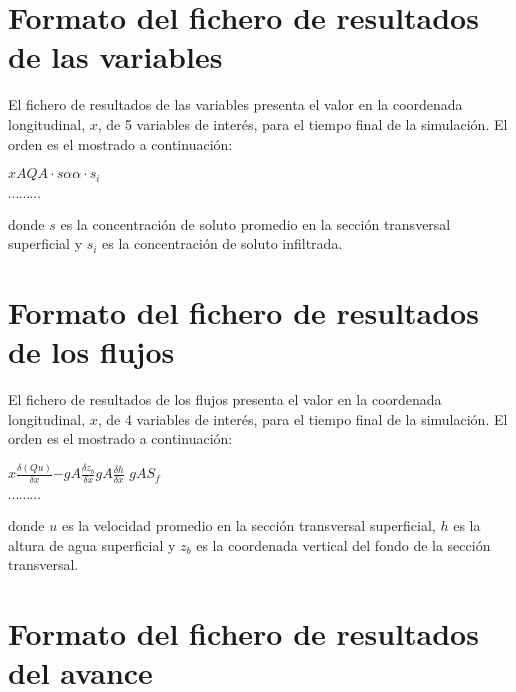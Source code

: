 \documentclass[a4paper,12pt]{report}
\begin{document}
\section{Formato del fichero de resultados de las variables}
El fichero de resultados de las variables presenta el valor en la coordenada longitudinal, $x$, de 5 variables de interés, para el tiempo final de la simulación. El orden es el mostrado a continuación:

\hspace{1.8cm}$x$\hspace{0.9cm}$A$\hspace{0.9cm}$Q$\hspace{0.9cm}$A\cdot s$\hspace{0.9cm}$\alpha$\hspace{0.9cm}$\alpha\cdot s_i$ 

\hspace{3.8cm} $\cdots \cdots \cdots$

\noindent donde $s$ es la concentración de soluto promedio en la sección transversal superficial y $s_i$ es la concentración de soluto infiltrada.

\section{Formato del fichero de resultados de los flujos}
El fichero de resultados de los flujos presenta el valor en la coordenada longitudinal, $x$, de 4 variables de interés, para el tiempo final de la simulación. El orden es el mostrado a continuación:

\hspace{1.8cm}$x$\hspace{0.9cm}$\frac{\delta(Qu)}{\delta x}$\hspace{0.9cm}$-gA\frac{\delta z_b}{\delta x}$\hspace{0.9cm}$gA\frac{\delta h}{\delta x}$
\hspace{0.9cm}$gAS_f$ 

\hspace{3.8cm} $\cdots \cdots \cdots$

\noindent donde $u$ es la velocidad promedio en la sección transversal superficial, $h$ es la altura de agua superficial y $z_b$ es la 
coordenada vertical del fondo de la sección transversal. 

\section{Formato del fichero de resultados del avance}
\end{document}
